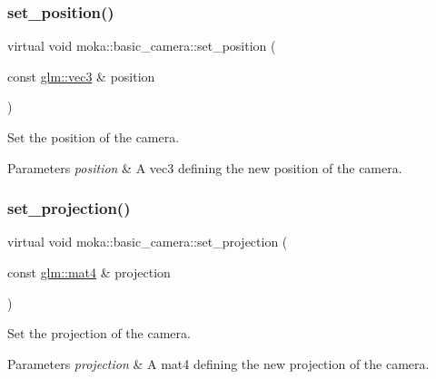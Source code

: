 \subsubsection{\texorpdfstring{set\_position()}{set\_position()}}
{\footnotesize\ttfamily virtual void moka\+::basic\+\_\+camera\+::set\+\_\+position (\begin{DoxyParamCaption}\item[{const \mbox{\hyperlink{namespacemoka_aed2224bc0e5b79e57a8975ded94ee1aaa97ade28e93c0de60adc075bdbe07ca36}{glm\+::vec3}} \&}]{position }\end{DoxyParamCaption})\hspace{0.3cm}{\ttfamily [virtual]}}



Set the position of the camera. 


\begin{DoxyParams}{Parameters}
{\em position} & A vec3 defining the new position of the camera. \\
\hline
\end{DoxyParams}
\mbox{\label{classmoka_1_1basic__camera_ac0cef3f49a34e3b63c6a58c8843768cd}} 
\subsubsection{\texorpdfstring{set\_projection()}{set\_projection()}}
{\footnotesize\ttfamily virtual void moka\+::basic\+\_\+camera\+::set\+\_\+projection (\begin{DoxyParamCaption}\item[{const \mbox{\hyperlink{namespacemoka_aed2224bc0e5b79e57a8975ded94ee1aaabe14b41eb96410ea28b32bc138d885ae}{glm\+::mat4}} \&}]{projection }\end{DoxyParamCaption})\hspace{0.3cm}{\ttfamily [virtual]}}



Set the projection of the camera. 


\begin{DoxyParams}{Parameters}
{\em projection} & A mat4 defining the new projection of the camera. \\
\hline
\end{DoxyParams}
\mbox{\label{classmoka_1_1basic__camera_ade33ff9968210e36f4235ad0b5a2aef5}} 
